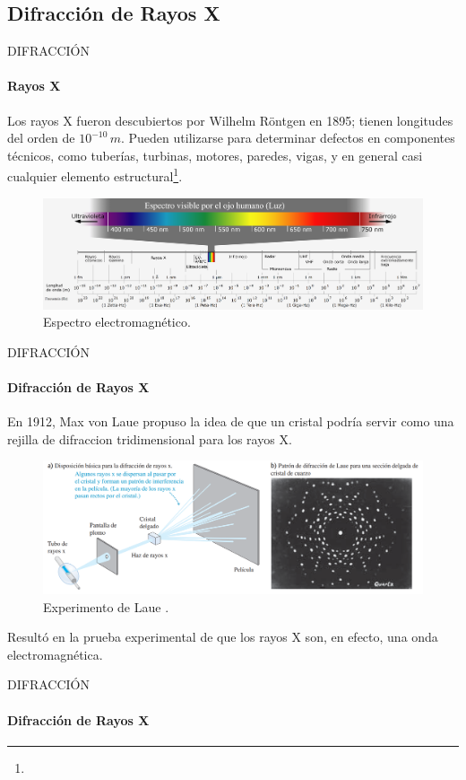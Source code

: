 \subsection{Difracción de Rayos X}
\begin{frame}{DIFRACCIÓN}
    \framesubtitle{Rayos X}
    Los rayos X fueron descubiertos por Wilhelm Röntgen en 1895; tienen longitudes del orden de $10^{-10}\,m$. Pueden utilizarse para determinar defectos en componentes técnicos, como tuberías, turbinas, motores, paredes, vigas, y en general casi cualquier elemento estructural\footnote{}.
    \begin{figure}
        \centering
        \includegraphics[scale=0.084]{david/espectro.png}
        \caption{Espectro electromagnético\footnotemark{}.}
    \end{figure}
    \vspace{-5mm}
\end{frame}



\begin{frame}{DIFRACCIÓN}
    \framesubtitle{Difracción de Rayos X}
    En 1912, Max von Laue propuso la idea de que un cristal podría servir como una rejilla de difraccion tridimensional para los rayos X.
    \begin{figure}[H]
		\centering
		\includegraphics[scale=0.1975]{david/Laue.PNG}
		\caption{Experimento de Laue \footnotemark{}.}
	\end{figure}
    Resultó en la prueba experimental de que los rayos X son, en efecto, una onda electromagnética.
    \vspace{-1cm}
\end{frame}

\begin{frame}{DIFRACCIÓN}
    \framesubtitle{Difracción de Rayos X}

\end{frame}
